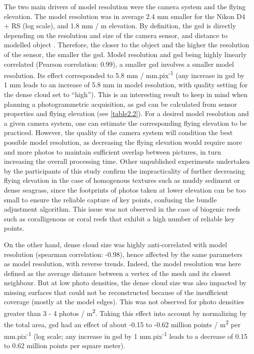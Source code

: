 The two main drivers of model resolution were the camera system and the flying elevation. The model resolution was in average 2.4 mm smaller for the Nikon D4 + RS (log scale), and 1.8 mm / m elevation. By definition, the \acrshort{gsd} is directly depending on the resolution and size of the camera sensor, and distance to modelled object \citep{forstner_photogrammetric_2016}. Therefore, the closer to the object and the higher the resolution of the sensor, the smaller the \acrshort{gsd}. Model resolution and \acrshort{gsd} being highly linearly correlated (Pearson correlation: 0.99), a smaller \acrshort{gsd} involves a smaller model resolution. Its effect corresponded to 5.8 mm / mm.pix\textsuperscript{-1} (any increase in \acrshort{gsd} by 1 mm leads to an increase of 5.8 mm in model resolution, with quality setting for the dense cloud set to “high”). This is an interesting result to keep in mind when planning a photogrammetric acquisition, as \acrshort{gsd} can be calculated from sensor properties and flying elevation (see \autoref{table2.2}). For a desired model resolution and a given camera system, one can estimate the corresponding flying elevation to be practiced. However, the quality of the camera system will condition the best possible model resolution, as decreasing the flying elevation would require more and more photos to maintain sufficient overlap between pictures, in turn increasing the overall processing time. Other unpublished experiments undertaken by the participants of this study confirm the impracticality of further decreasing flying elevation in the case of homogenous textures such as muddy sediment or dense seagrass, since the footprints of photos taken at lower elevation can be too small to ensure the reliable capture of key points, confusing the bundle adjustment algorithm. This issue was not observed in the case of biogenic reefs such as coralligenous or coral reefs that exhibit a high number of reliable key points.

On the other hand, dense cloud size was highly anti-correlated with model resolution (spearman correlation: -0.98), hence affected by the same parameters as model resolution, with reverse trends. Indeed, the model resolution was here defined as the average distance between a vertex of the mesh and its closest neighbour. But at low photo densities, the dense cloud size was also impacted by missing surfaces that could not be reconstructed because of the insufficient coverage (mostly at the model edges). This was not observed for photo densities greater than 3 - 4 photos / m\textsuperscript{2}. Taking this effect into account by normalizing by the total area, \acrshort{gsd} had an effect of about -0.15 to -0.62 million points / m\textsuperscript{2} per mm.pix\textsuperscript{-1} (log scale; any increase in \acrshort{gsd} by 1 mm.pix\textsuperscript{-1} leads to a decrease of 0.15 to 0.62 million points per square meter).

